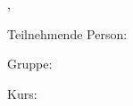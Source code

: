 
\begin{titlepage}
    \vspace{20mm}
    \begin{center}
        \scalebox{1.6}{\textbf{\Large \versuch}}\par
        \vspace{20mm}
        , \cite{Skript} \cite{Joni}\par
        \vspace{10mm}
        \scalebox{1.2}{\datum}\par
    \end{center}
    \vspace{150mm}
    Teilnehmende Person: \textbf{\name}\par
    Gruppe: \gruppe\par
    Kurs: \Kurs\par
\end{titlepage}
